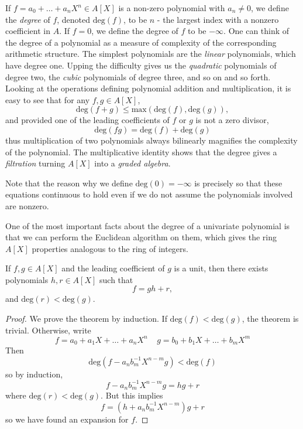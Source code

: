 If $f = a_0 + \dots + a_nX^n \in A[X]$ is a non-zero polynomial with $a_n \neq 0$, we define the {\it degree} of $f$, denoted $\text{deg}(f)$, to be $n$ - the largest index with a nonzero coefficient in $A$. If $f = 0$, we define the degree of $f$ to be $-\infty$. One can think of the degree of a polynomial as a measure of complexity of the corresponding arithmetic structure. The simplest polynomials are the {\it linear} polynomials, which have degree one. Upping the difficulty gives us the {\it quadratic} polynomials of degree two, the {\it cubic} polynomials of degree three, and so on and so forth. Looking at the operations defining polynomial addition and multiplication, it is easy to see that for any $f,g \in A[X]$,
%
\[ \text{deg}(f + g) \leq \text{max}(\text{deg}(f), \text{deg}(g)), \]
%
and provided one of the leading coefficients of $f$ or $g$ is not a zero divisor,
%
\[ \text{deg}(fg) = \text{deg}(f) + \text{deg}(g) \]
%
thus multiplication of two polynomials always bilinearly magnifies the complexity of the polynomial. The multiplicative identity shows that the degree gives a {\it filtration} turning $A[X]$ into a {\it graded algebra}.

\begin{remark}
	Note that the reason why we define $\text{deg}(0) = -\infty$ is precisely so that these equations continuous to hold even if we do not assume the polynomials involved are nonzero.
\end{remark}

One of the most important facts about the degree of a univariate polynomial is that we can perform the Euclidean algorithm on them, which gives the ring $A[X]$ properties analogous to the ring of integers.

\begin{theorem}
    If $f,g \in A[X]$ and the leading coefficient of $g$ is a unit, then there exists polynomials $h,r \in A[X]$ such that
    \[ f = gh + r, \]
    and $\text{deg}(r) < \text{deg}(g)$.
\end{theorem}
\begin{proof}
    We prove the theorem by induction. If $\text{deg}(f) < \text{deg}(g)$, the theorem is trivial. Otherwise, write
    \[ f = a_0 + a_1 X + \dots + a_n X^n\ \ \ \ \ g = b_0 + b_1 X + \dots + b_m X^m \]
    Then
    \[ \text{deg}(f - a_n b_m^{-1} X^{n - m} g) < \text{deg}(f) \]
    so by induction,
    \[ f - a_n b_m^{-1} X^{n-m} g = hg + r \]
    where $\text{deg}(r) < \text{deg}(g)$. But this implies
    \[ f = (h + a_n b_m^{-1} X^{n-m}) g + r \]
    so we have found an expansion for $f$.
\end{proof}

